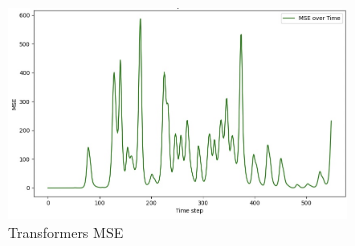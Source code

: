 \documentclass[11pt]{article}
\begin{document}
\begin{figure}[h]
\centering
\includegraphics[width=0.8\textwidth]{transformers_mse.jpeg}
\caption{Transformers MSE}
\label{fig:transformers:mse}
\end{figure}

\clearpage


\end{document}
